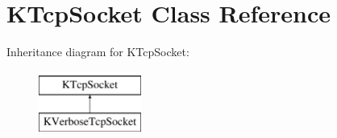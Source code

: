 \hypertarget{class_k_tcp_socket}{\section{\-K\-Tcp\-Socket \-Class \-Reference}
\label{class_k_tcp_socket}
}
\-Inheritance diagram for \-K\-Tcp\-Socket\-:\begin{figure}[H]
\begin{center}
\leavevmode
\includegraphics[height=2.000000cm]{class_k_tcp_socket}
\end{center}
\end{figure}
